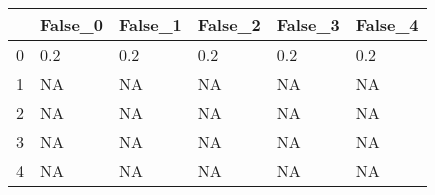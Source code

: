 \begin{tabular}{llllll}
\toprule
{} & False\_0 & False\_1 & False\_2 & False\_3 & False\_4 \\ \hline
\midrule
0 &     0.2 &     0.2 &     0.2 &     0.2 &     0.2 \\ \hline
1 &      NA &      NA &      NA &      NA &      NA \\ \hline
2 &      NA &      NA &      NA &      NA &      NA \\ \hline
3 &      NA &      NA &      NA &      NA &      NA \\ \hline
4 &      NA &      NA &      NA &      NA &      NA \\ \hline
\bottomrule
\end{tabular}
